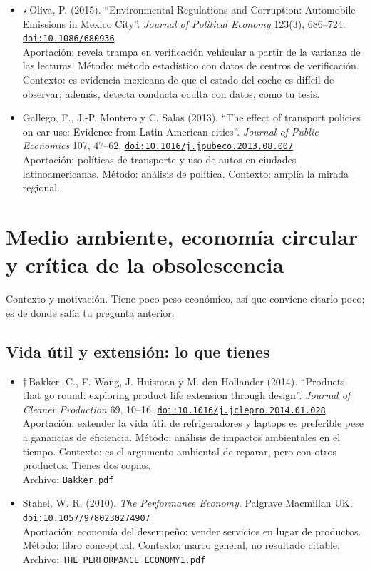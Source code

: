 \documentclass[11pt]{article}
\begin{document}
\begin{itemize}
\item $\star$\,Oliva, P. (2015). ``Environmental Regulations and Corruption: Automobile Emissions in Mexico City''. \textit{Journal of Political Economy} 123(3), 686--724. \href{https://doi.org/10.1086/680936}{\texttt{doi:10.1086/680936}}\\
Aportación: revela trampa en verificación vehicular a partir de la varianza de las lecturas. Método: método estadístico con datos de centros de verificación. Contexto: es evidencia mexicana de que el estado del coche es difícil de observar; además, detecta conducta oculta con datos, como tu tesis.
\item Gallego, F., J.-P. Montero y C. Salas (2013). ``The effect of transport policies on car use: Evidence from Latin American cities''. \textit{Journal of Public Economics} 107, 47--62. \href{https://doi.org/10.1016/j.jpubeco.2013.08.007}{\texttt{doi:10.1016/j.jpubeco.2013.08.007}}\\
Aportación: políticas de transporte y uso de autos en ciudades latinoamericanas. Método: análisis de política. Contexto: amplía la mirada regional.
\end{itemize}

\section{Medio ambiente, economía circular y crítica de la obsolescencia}
Contexto y motivación. Tiene poco peso económico, así que conviene citarlo poco; es de donde salía tu pregunta anterior.

\subsection*{Vida útil y extensión: lo que tienes}
\begin{itemize}
\item $\dagger$\,Bakker, C., F. Wang, J. Huisman y M. den Hollander (2014). ``Products that go round: exploring product life extension through design''. \textit{Journal of Cleaner Production} 69, 10--16. \href{https://doi.org/10.1016/j.jclepro.2014.01.028}{\texttt{doi:10.1016/j.jclepro.2014.01.028}}\\
Aportación: extender la vida útil de refrigeradores y laptops es preferible pese a ganancias de eficiencia. Método: análisis de impactos ambientales en el tiempo. Contexto: es el argumento ambiental de reparar, pero con otros productos. Tienes dos copias.\\
{\footnotesize Archivo: \texttt{Bakker.pdf}}
\item Stahel, W. R. (2010). \textit{The Performance Economy}. Palgrave Macmillan UK. \href{https://doi.org/10.1057/9780230274907}{\texttt{doi:10.1057/9780230274907}}\\
Aportación: economía del desempeño: vender servicios en lugar de productos. Método: libro conceptual. Contexto: marco general, no resultado citable.\\
{\footnotesize Archivo: \texttt{THE\_PERFORMANCE\_ECONOMY1.pdf}}
\end{itemize}
\end{document}
